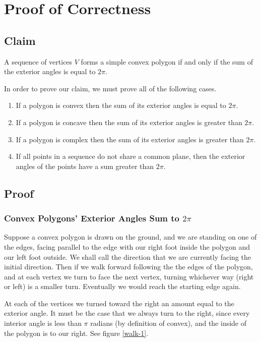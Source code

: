 \documentclass{article}
\begin{document}
\section{Proof of Correctness}

\subsection{Claim}

A sequence of vertices \(V\) forms a simple convex polygon if and only if the sum of the exterior angles is equal to \(2\pi\).

In order to prove our claim, we must prove all of the following cases.
\begin{enumerate}
	\item If a polygon is convex then the sum of its exterior angles is equal to \(2\pi\).
	\item If a polygon is concave then the sum of its exterior angles is greater than \(2\pi\).
	\item If a polygon is complex then the sum of its exterior angles is greater than \(2\pi\).
	\item If all points in a sequence do not share a common plane, then the exterior angles of the points have a sum greater than \(2\pi\).
\end{enumerate}

\subsection{Proof}

\subsubsection{Convex Polygons' Exterior Angles Sum to \(2\pi\)}

Suppose a convex polygon is drawn on the ground, and we are standing on one of the edges, facing parallel to the edge with our right foot inside the polygon and our left foot outside. We shall call the direction that we are currently facing the initial direction. Then if we walk forward following the the edges of the polygon, and at each vertex we turn to face the next vertex, turning whichever way (right or left) is a smaller turn. Eventually we would reach the starting edge again.

At each of the vertices we turned toward the right an amount equal to the exterior angle. It must be the case that we always turn to the right, since every interior angle is less than \(\pi\) radians (by definition of convex), and the inside of the polygon is to our right. See figure \ref{walk-1}.
\end{document}
